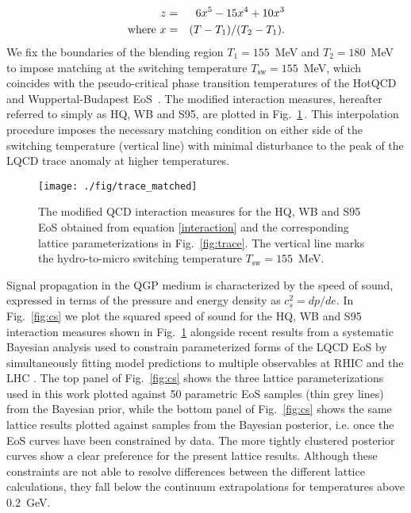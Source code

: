 \documentclass[aps,prc,reprint,amsmath,nofootinbib,superscriptaddress]{revtex4-1}
\begin{document}
\begin{eqnarray}
 \label{smoothstep}
 \cr z &=& 6 x^5 - 15 x^4 + 10 x^3 \\
  \text{where } x &=& (T - T_1)/(T_2 - T_1).
\end{eqnarray}
We fix the boundaries of the blending region $T_1=155$~MeV and $T_2=180$~MeV to impose matching at the switching temperature $T_\text{sw} = 155$~MeV, which coincides with the pseudo-critical phase transition temperatures of the HotQCD and Wuppertal-Budapest EoS~\cite{Borsanyi:2010gc,Bazavov:2012iu,Bhattacharya:2014iw}. The modified interaction measures, hereafter referred to simply as HQ, WB and S95, are plotted in Fig.~\ref{fig:trace_final}\,. This interpolation procedure imposes the necessary matching condition on either side of the switching temperature (vertical line) with minimal disturbance to the peak of the LQCD trace anomaly at higher temperatures.

\begin{figure}[t]
  \texttt{[image: ./fig/trace\_matched]}
  \caption{\label{fig:trace_final} The modified QCD interaction measures for the HQ, WB and S95 EoS obtained from equation \eqref{interaction} and the corresponding lattice
	  parameterizations in Fig.~\ref{fig:trace}. The vertical line marks the hydro-to-micro switching temperature $T_\text{sw} = 155$~MeV.}
\end{figure}

Signal propagation in the QGP medium is characterized by the speed of sound, expressed in terms of the pressure and energy density as $c_s^2 = dp/de$.
In Fig.~\ref{fig:cs} we plot the squared speed of sound for the HQ, WB and S95 interaction measures shown in Fig.~\ref{fig:trace_final} alongside recent results from a systematic Bayesian analysis used to constrain parameterized forms of the LQCD EoS by simultaneously fitting model predictions to multiple observables at RHIC and the LHC \cite{Pratt:2015zsa}. 
The top panel of Fig.~\ref{fig:cs} shows the three lattice parameterizations used in this work plotted against 50 parametric EoS samples (thin grey lines) from the Bayesian prior, while the bottom panel of Fig.~\ref{fig:cs} shows the same lattice results plotted against samples from the Bayesian posterior, i.e. once the EoS curves have been constrained by data. The more tightly clustered posterior curves show a clear preference for the present lattice results.  Although these constraints are not able to resolve differences between the different lattice calculations, they fall below the continuum extrapolations for temperatures above 0.2~GeV.
\end{document}
